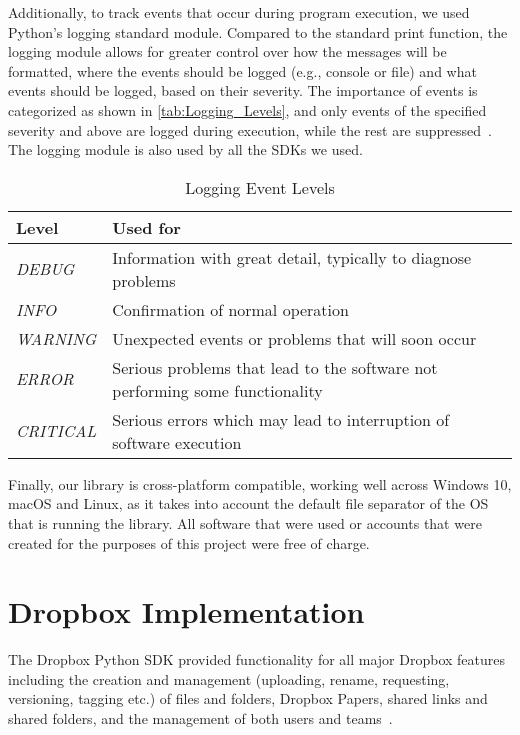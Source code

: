Additionally, to track events that occur during program execution, we used Python's logging standard module. Compared to the standard print function, the logging module allows for greater control over how the messages will be formatted, where the events should be logged (e.g., console or file) and what events should be logged, based on their severity. The importance of events is categorized as shown in \autoref{tab:Logging_Levels}, and only events of the specified severity and above are logged during execution, while the rest are suppressed~\cite{python_logging}. The logging module is also used by all the SDKs we used.

\begin{table}[!h]
    \centering
    \caption{Logging Event Levels}
    \label{tab:Logging_Levels}
    \begin{tabular}{|l|l|}
        \hline
        \rowcolor[HTML]{EFEFEF}
        \textbf{Level}    & \textbf{Used for}                \\ \hline
        \textit{DEBUG}    & Information with great detail, typically to diagnose problems                \\ \hline
        \textit{INFO}     & Confirmation of normal operation \\ \hline
        \textit{WARNING}  & Unexpected events or problems that will soon occur                           \\ \hline
        \textit{ERROR}    & Serious problems that lead to the software not performing some functionality \\ \hline
        \textit{CRITICAL} & Serious errors which may lead to interruption of software execution          \\ \hline
    \end{tabular}
\end{table}

Finally, our library is cross-platform compatible, working well across Windows 10, macOS and Linux, as it takes into account the default file separator of the OS that is running the library. All software that were used or accounts that were created for the purposes of this project were free of charge.

\section{Dropbox Implementation}
The Dropbox Python SDK provided functionality for all major Dropbox features including the creation and management (uploading, rename, requesting, versioning, tagging etc.) of files and folders, Dropbox Papers, shared links and shared folders, and the management of both users and teams~\cite{dropbox_docs}.


